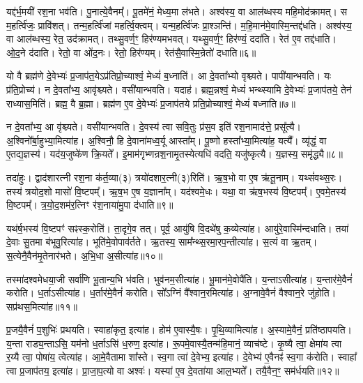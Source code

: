 यद्द॑र्भ॒मयी॑ रश॒ना भव॑ति।
पु॒नात्ये॒वैनम्᳚।
पू॒तमे॑नं॒ मेध्य॒मा ल॑भते।
अश्व॑स्य॒ वा आल॑ब्धस्य महि॒मोद॑क्रामत्।
स म॒हर्त्वि॑जः॒ प्रावि॑शत्।
तन्म॒हर्त्वि॑जां महर्त्वि॒क्त्वम्।
यन्म॒हर्त्वि॑जः प्रा॒श्ञन्ति॑।
म॒हि॒मान॑मे॒वास्मि॒न्तद्द॑धति।
अश्व॑स्य॒ वा आल॑ब्धस्य॒ रेत॒ उद॑क्रामत्।
तथ्सु॒वर्ण॒ꣳ॒ हिर॑ण्यमभवत्।
यथ्सु॒वर्ण॒ꣳ॒ हिर॑ण्यं॒ ददा॑ति।
रेत॑ ए॒व तद्द॑धाति।
ओ॒द॒ने द॑दाति।
रेतो॒ वा ओ॑द॒नः।
रेतो॒ हिर॑ण्यम्।
रेत॑सै॒वास्मि॒न्रेतो॑ दधाति॥६॥\anuvakamend[द॒धा॒ति॒ रु॒न्धे॒ द॒र्भा अ॑भव॒थ्षट् च॑]

यो वै ब्रह्म॑णे दे॒वेभ्यः॑ प्र॒जाप॑त॒ये\-ऽप्र॑तिप्रो॒च्याश्वं॒ मेध्यं॑ ब॒ध्नाति॑।
आ दे॒वता᳚भ्यो वृश्च्यते।
पापी॑यान्भवति।
यः प्र॑ति॒प्रोच्य॑।
न दे॒वता᳚भ्य॒ आवृ॑श्च्यते।
वसी॑यान्भवति।
यदाह॑।
ब्रह्म॒न्नश्वं॒ मेध्यं॑ भन्थ्स्यामि दे॒वेभ्यः॑ प्र॒जाप॑तये॒ तेन॑ राध्यास॒मिति॑।
ब्रह्म॒ वै ब्र॒ह्मा।
ब्रह्म॑ण ए॒व दे॒वेभ्यः॑ प्र॒जाप॑तये प्रति॒प्रोच्याश्वं॒ मेध्यं॑ बध्नाति॥७॥

न दे॒वता᳚भ्य॒ आ वृ॑श्च्यते।
वसी॑यान्भवति।
दे॒वस्य॑ त्वा सवि॒तुः प्र॑स॒व इति॑ रश॒नामाद॑त्ते॒ प्रसू᳚त्यै।
अ॒श्विनो᳚र्बा॒हुभ्या॒मित्या॑ह।
अ॒श्विनौ॒ हि दे॒वाना॑मध्व॒र्यू आस्ता᳚म्।
पू॒ष्णो हस्ता᳚भ्या॒मित्या॑ह॒ यत्यै᳚।
व्यृ॑द्धं॒ वा ए॒तद्य॒ज्ञस्य॑।
यद॑य॒जुष्के॑ण क्रि॒यते᳚।
इ॒माम॑गृभ्णन्रश॒नामृ॒तस्ये\-त्यधि॑ वदति॒ यजु॑ष्कृत्यै।
य॒ज्ञस्य॒ समृ॑द्ध्यै॥८॥

तदा॑हुः।
द्वाद॑शारत्नी रश॒ना क॑र्त॒व्या(३) त्रयो॑दशार॒त्नी(३)\-रिति॑।
ऋ॒ष॒भो वा ए॒ष ऋ॑तू॒नाम्।
यथ्सं॑वथ्स॒रः।
तस्य॑ त्रयोद॒शो मासो॑ वि॒ष्टपम्᳚।
ऋ॒ष॒भ ए॒ष य॒ज्ञाना᳚म्।
यद॑श्वमे॒धः।
यथा॒ वा ऋ॑ष॒भस्य॑ वि॒ष्टपम्᳚।
ए॒वमे॒तस्य॑ वि॒ष्टपम्᳚।
त्र॒यो॒द॒शम॑र॒त्निꣳ र॑श॒नाया॑मु॒पा द॑धाति॥९॥

यथ॑र्\mbox{}ष॒भस्य॑ वि॒ष्टपꣳ॑ सꣴस्क॒रोति॑।
ता॒दृगे॒व तत्।
पूर्व॒ आयु॑षि वि॒दथे॑षु क॒व्येत्या॑ह।
आयु॑रे॒वास्मि॑न्दधाति।
तया॑ दे॒वाः सु॒तमा ब॑भूवु॒रित्या॑ह।
भूति॑मे॒वोपाव॑र्तते।
ऋ॒तस्य॒ साम᳚न्थ्स॒रमा॒रप॒न्तीत्या॑ह।
स॒त्यं वा ऋ॒तम्।
स॒त्येनै॒वैन॑मृ॒तेनार॑भते।
अ॒भि॒धा अ॒सीत्या॑ह॥१०॥

तस्मा॑दश्वमेधया॒जी सर्वा॑णि भू॒तान्य॒भि भ॑वति।
भुव॑नम॒सीत्या॑ह।
भू॒मान॑मे॒वोपै॑ति।
य॒न्ता\-ऽसीत्या॑ह।
य॒न्तार॑मे॒वैनं॑ करोति।
ध॒र्ताऽसीत्या॑ह।
ध॒र्तार॑मे॒वैनं॑ करोति।
सो᳚ऽग्निं वै᳚श्वान॒रमित्या॑ह।
अ॒ग्नावे॒वैनं॑ वैश्वान॒रे जु॑होति।
सप्र॑थस॒मित्या॑ह॥११॥

प्र॒जयै॒वैनं॑ प॒शुभिः॑ प्रथयति।
स्वाहा॑कृत॒ इत्या॑ह।
होम॑ ए॒वास्यै॒षः।
पृ॒थि॒व्यामित्या॑ह।
अ॒स्यामे॒वैनं॒ प्रति॑\-ष्ठापयति।
य॒न्ता राड्य॒न्ताऽसि॒ यम॑नो ध॒र्ताऽसि॑ ध॒रुण॒ इत्या॑ह।
रू॒पमे॒वास्यै॒तन्म॑हि॒मानं॒ व्याच॑ष्टे।
कृ॒ष्यै त्वा॒ क्षेमा॑य त्वा र॒य्यै त्वा॒ पोषा॑य॒ त्वेत्या॑ह।
आ॒\-मे॒वैतामा शा᳚स्ते।
स्व॒गा त्वा॑ दे॒वेभ्य॒ इत्या॑ह।
दे॒वेभ्य॑ ए॒वैनꣴ॑ स्व॒गा क॑रोति।
स्वाहा᳚ त्वा प्र॒जाप॑तय॒ इत्या॑ह।
प्रा॒जा॒प॒त्यो वा अश्वः॑।
यस्या॑ ए॒व दे॒वता॑या आल॒भ्यते᳚।
तयै॒वैन॒ꣳ॒ सम॑र्धयति॥१२॥\anuvakamend[ब॒ध्ना॒ति॒ समृ॑द्ध्या उ॒पाद॑धात्य॒सीत्या॑ह॒ सप्र॑थस॒मित्या॑ह दे॒वेभ्य॒ इत्या॑ह॒ पञ्च॑ च]

